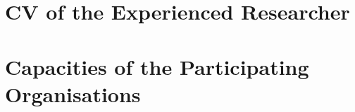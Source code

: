 \documentclass[a4paper,11pt]{article}
\begin{document}
\newpage
\section{CV of the Experienced Researcher}
\label{sec:cv}



\newpage
\section{Capacities of the Participating Organisations}
\label{sec:capacities}

\vspace{\baselineskip}
\end{document}
